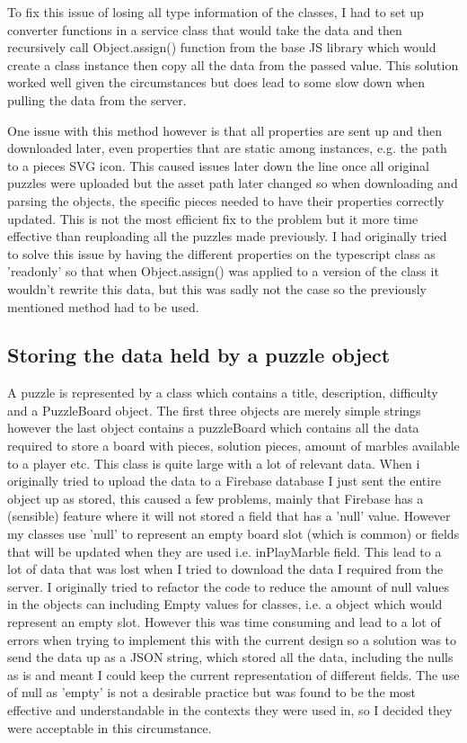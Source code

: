 \documentclass{l4proj}
\begin{document}
To fix this issue of losing all type information of the classes, I had to set up converter functions in a service class that would take the data and then recursively call Object.assign() function from the base JS library which would create a class instance then copy all the data from the passed value. This solution worked well given the circumstances but does lead to some slow down when pulling the data from the server.

One issue with this method however is that all properties are sent up and then downloaded later, even properties that are static among instances, e.g. the path to a pieces SVG icon. This caused issues later down the line once all original puzzles were uploaded but the asset path later changed so when downloading and parsing the objects, the specific pieces needed to have their properties correctly updated. This is not the most efficient fix to the problem but it more time effective than reuploading all the puzzles made previously. I had originally tried to solve this issue by having the different properties on the typescript class as 'readonly' so that when Object.assign() was applied to a version of the class it wouldn't rewrite this data, but this was sadly not the case so the previously mentioned method had to be used. 

\subsection{Storing the data held by a puzzle object}
A puzzle is represented by a class which contains a title, description, difficulty and a PuzzleBoard object. The first three objects are merely simple strings however the last object contains a puzzleBoard which contains all the data required to store a board with pieces, solution pieces, amount of marbles available to a player etc. This class is quite large with a lot of relevant data. When i originally tried to upload the data to a Firebase database I just sent the entire object up as stored, this caused a few problems, mainly that Firebase has a (sensible) feature where it will not stored a field that has a 'null' value. However my classes use 'null' to represent an empty board slot (which is common) or fields that will be updated when they are used i.e. inPlayMarble field. This lead to a lot of data that was lost when I tried to download the data I required from the server. I originally tried to refactor the code to reduce the amount of null values in the objects can including Empty values for classes, i.e. a object which would represent an empty slot. However this was time consuming and lead to a lot of errors when trying to implement this with the current design so a solution was to send the data up as a JSON string, which stored all the data, including the nulls as is and meant I could keep the current representation of different fields. The use of null as 'empty' is not a desirable practice but was found to be the most effective and understandable in the contexts they were used in, so I decided they were acceptable in this circumstance.
\end{document}
